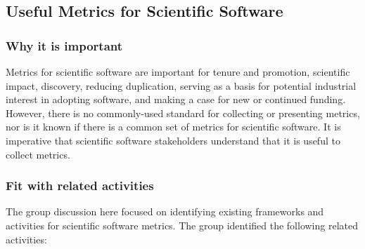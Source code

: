 \subsection{Useful Metrics for Scientific Software}
\label{sec:software-metrics}
 
\subsubsection{Why it is important}

Metrics for scientific software are important for tenure and promotion, scientific impact, discovery, reducing duplication, serving as a basis for potential industrial interest in adopting software, and making a case for new or continued funding.  However, there is no commonly-used standard for collecting or presenting metrics, nor is it known if there is a common set of metrics for scientific software.  It is imperative that scientific software stakeholders understand that it is useful to collect metrics.

\subsubsection{Fit with related activities}

The group discussion here focused on identifying existing frameworks and activities for scientific software metrics.  The group identified the following related activities:

